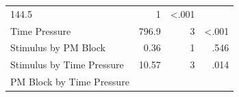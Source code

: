 \documentclass[11pt,]{article}
\begin{document}
\begin{longtable}[]{@{}lrrr@{}}
\begin{minipage}[t]{0.16\columnwidth}
144.5\strut
\end{minipage} & \begin{minipage}[t]{0.06\columnwidth}\raggedleft\strut
1\strut
\end{minipage} & \begin{minipage}[t]{0.06\columnwidth}\raggedleft\strut
\textless{}.001\strut
\end{minipage}\tabularnewline
\begin{minipage}[t]{0.36\columnwidth}\raggedright\strut
Time Pressure\strut
\end{minipage} & \begin{minipage}[t]{0.16\columnwidth}\raggedleft\strut
796.9\strut
\end{minipage} & \begin{minipage}[t]{0.06\columnwidth}\raggedleft\strut
3\strut
\end{minipage} & \begin{minipage}[t]{0.06\columnwidth}\raggedleft\strut
\textless{}.001\strut
\end{minipage}\tabularnewline
\begin{minipage}[t]{0.36\columnwidth}\raggedright\strut
Stimulus by PM Block\strut
\end{minipage} & \begin{minipage}[t]{0.16\columnwidth}\raggedleft\strut
0.36\strut
\end{minipage} & \begin{minipage}[t]{0.06\columnwidth}\raggedleft\strut
1\strut
\end{minipage} & \begin{minipage}[t]{0.06\columnwidth}\raggedleft\strut
.546\strut
\end{minipage}\tabularnewline
\begin{minipage}[t]{0.36\columnwidth}\raggedright\strut
Stimulus by Time Pressure\strut
\end{minipage} & \begin{minipage}[t]{0.16\columnwidth}\raggedleft\strut
10.57\strut
\end{minipage} & \begin{minipage}[t]{0.06\columnwidth}\raggedleft\strut
3\strut
\end{minipage} & \begin{minipage}[t]{0.06\columnwidth}\raggedleft\strut
.014\strut
\end{minipage}\tabularnewline
\begin{minipage}[t]{0.36\columnwidth}\raggedright\strut
PM Block by Time Pressure\strut
\end{minipage} & \begin{minipage}[t]{0.16\columnwidth}\raggedleft\strut

\end{minipage}
\end{longtable}
\end{document}
